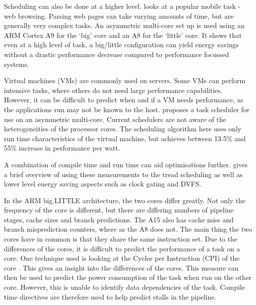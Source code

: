 Scheduling can also be done at a higher level. 
\cite{zhu2013high} looks at a popular mobile task - web browsing. 
Parsing web pages can take varying amounts of time, but are generally very complex tasks. 
An asymmetric multi-core set up is used using an ARM Cortex A9 for the `big' core and an A8 for the `little' core. 
It shows that even at a high level of task, a big/little configuration can yield energy savings without a drastic performance decrease compared to performance focussed systems.

Virtual machines (VMs) are commonly used on servers. 
Some VMs can perform intensive tasks, where others do not need large performance capabilities.
However, it can be difficult to predict when and if a VM needs performance, as the applications run may not be known to the host. 
\cite{wang2012energy} proposes a task scheduler for use on an asymmetric multi-core. 
Current schedulers are not aware of the heterogeneities of the processor cores. 
The scheduling algorithm here uses only run time characteristics of the virtual machine, but achieves between 13.5\% and 55\% increase in performance per watt.

A combination of compile time and run time can aid optimisations further. 
\cite{de2012power} gives a brief overview of using these measurements to the tread scheduling as well as lower level energy saving aspects such as clock gating and DVFS. 


In the ARM big.LITTLE architecture, the two cores differ greatly. 
Not only the frequency of the core is different, but there are differing numbers of pipeline stages, cache sizes and branch predictions.
The A15 also has cache miss and branch misprediction counters, where as the A8 does not. 
The main thing the two cores have in common is that they share the same instruction set. 
Due to the differences of the cores, it is difficult to predict the performance of a task on a core.
One technique used is looking at the Cycles per Instruction (CPI) of the core \cite{pricopi2013power}. 
This gives an insight into the differences of the cores. 
This measure can then be used to predict the power consumption of the task when run on the other core. 
However, this is unable to identify data dependencies of the task. 
Compile time directives are therefore used to help predict stalls in the pipeline. 


